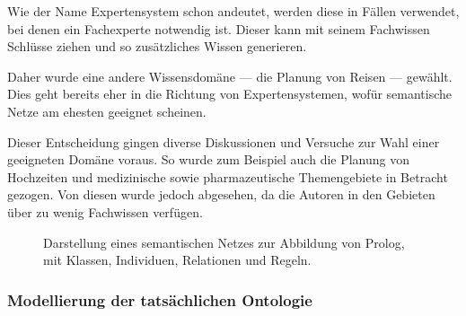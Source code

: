 Wie der Name Expertensystem schon andeutet, werden diese in Fällen verwendet, bei denen ein Fachexperte notwendig ist. Dieser kann mit seinem Fachwissen Schlüsse ziehen und so zusätzliches Wissen generieren.

Daher wurde eine andere Wissensdomäne --- die Planung von Reisen --- gewählt. Dies geht bereits eher in die Richtung von Expertensystemen, wofür semantische Netze am ehesten geeignet scheinen.

Dieser Entscheidung gingen diverse Diskussionen und Versuche zur Wahl einer geeigneten Domäne voraus. So wurde zum Beispiel auch die Planung von Hochzeiten und medizinische sowie pharmazeutische Themengebiete in Betracht gezogen. Von diesen wurde jedoch abgesehen, da die Autoren in den Gebieten über zu wenig Fachwissen verfügen.

\begin{figure}[H]
\centering {}
\caption{Darstellung eines semantischen Netzes zur Abbildung von Prolog, mit Klassen, Individuen, Relationen und Regeln.\label{fig:prolog_netz}\protect\footnotemark}
\end{figure}

\subsubsection{Modellierung der tatsächlichen Ontologie}
\label{sub:modellierung_der_ontologie_tatsaechliche}

